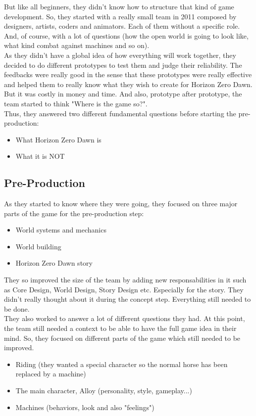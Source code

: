 \documentclass[a4paper]{article}
\begin{document}
\noindent But like all beginners, they didn't know how to structure that kind of game development. So,
they started with a really small team in 2011 composed by designers, artists, coders and 
animators. Each of them without a specific role. And, of course, with a lot of questions
(how the open world is going to look like, what kind combat against machines and so on).\\

\noindent As they didn't have a global idea of how everything will work together, they decided to
do different prototypes to test them and judge their reliability. The feedbacks were really
good in the sense that these prototypes were really effective and helped them to really know
what they wish to create for Horizon Zero Dawn. But it was costly in money and time. And also, 
prototype after prototype, the team started to think "Where is the game so?".\\

\noindent Thus, they answered two different fundamental questions before starting the pre-production:
\begin{itemize}
  \item What Horizon Zero Dawn is
  \item What it is NOT
\end{itemize}

\subsection{Pre-Production}

As they started to know where they were going, they focused on three major parts of the game for
the pre-production step:
\begin{itemize}
  \item World systems and mechanics
  \item World building
  \item Horizon Zero Dawn story
\end{itemize}

\noindent They so improved the size of the team by adding new responsabilities in it such as Core Design,
World Design, Story Design etc. Especially for the story. They didn't really thought about it
during the concept step. Everything still needed to be done.\\

\noindent They also worked to answer a lot of different questions they had. At this point, the team
still needed a context to be able to have the full game idea in their mind. So, they focused on
different parts of the game which still needed to be improved.
\begin{itemize}
  \item Riding (they wanted a special character so the normal horse has been replaced by a machine)
  \item The main character, Alloy (personality, style, gameplay...)
  \item Machines (behaviors, look and also "feelings")
\end{itemize}
\end{document}
